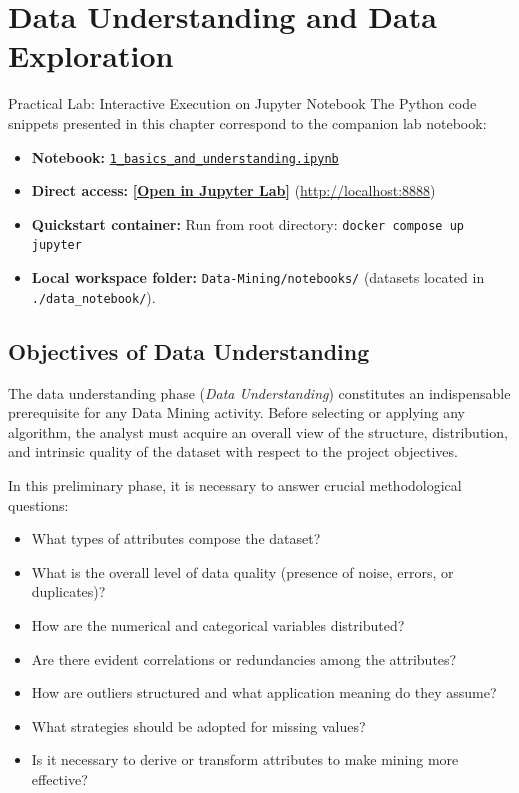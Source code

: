\chapter{Data Understanding and Data Exploration}
\label{ch:data-understanding}

\begin{noteblock}{Practical Lab: Interactive Execution on Jupyter Notebook}
The Python code snippets presented in this chapter correspond to the companion lab notebook:
\begin{itemize}
    \item \textbf{Notebook:} \href{http://localhost:8888/lab/tree/notebooks/1_basics_and_understanding.ipynb}{\texttt{1\_basics\_and\_understanding.ipynb}}
    \item \textbf{Direct access:} \href{http://localhost:8888/lab/tree/notebooks/1_basics_and_understanding.ipynb}{\textbf{[Open in Jupyter Lab]}} \quad (\url{http://localhost:8888})
    \item \textbf{Quickstart container:} Run from root directory: \texttt{docker compose up jupyter}
    \item \textbf{Local workspace folder:} \texttt{Data-Mining/notebooks/} (datasets located in \texttt{./data\_notebook/}).
\end{itemize}
\end{noteblock}

\FloatBarrier
\section{Objectives of Data Understanding}

The data understanding phase (\textit{Data Understanding}) constitutes an indispensable prerequisite for any Data Mining activity. Before selecting or applying any algorithm, the analyst must acquire an overall view of the structure, distribution, and intrinsic quality of the dataset with respect to the project objectives.

In this preliminary phase, it is necessary to answer crucial methodological questions:
\begin{itemize}
    \item What types of attributes compose the dataset?
    \item What is the overall level of data quality (presence of noise, errors, or duplicates)?
    \item How are the numerical and categorical variables distributed?
    \item Are there evident correlations or redundancies among the attributes?
    \item How are outliers structured and what application meaning do they assume?
    \item What strategies should be adopted for missing values?
    \item Is it necessary to derive or transform attributes to make mining more effective?
\end{itemize}

